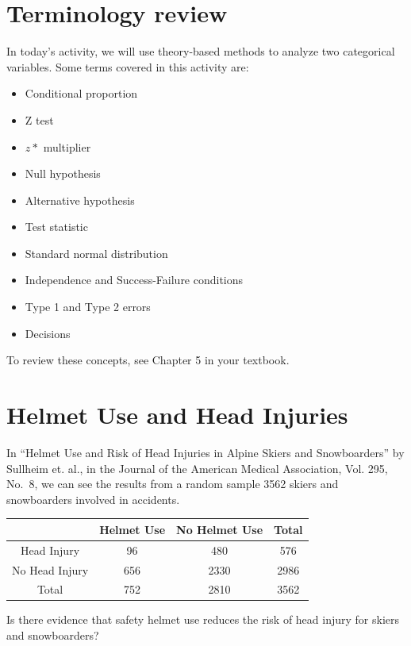 \documentclass[
]{report}
\begin{document}
\hypertarget{terminology-review}{%
\section{Terminology review}\label{terminology-review}}

In today's activity, we will use theory-based methods to analyze two categorical variables. Some terms covered in this activity are:

\begin{itemize}
\item
  Conditional proportion
\item
  Z test
\item
  \(z*\) multiplier
\item
  Null hypothesis
\item
  Alternative hypothesis
\item
  Test statistic
\item
  Standard normal distribution
\item
  Independence and Success-Failure conditions
\item
  Type 1 and Type 2 errors
\item
  Decisions
\end{itemize}

To review these concepts, see Chapter 5 in your textbook.

\newpage

\hypertarget{helmet-use-and-head-injuries}{%
\section{Helmet Use and Head Injuries}\label{helmet-use-and-head-injuries}}

In ``Helmet Use and Risk of Head Injuries in Alpine Skiers and Snowboarders'' by Sullheim et. al., in the Journal of the American Medical Association, Vol. 295, No.~8, we can see the results from a random sample 3562 skiers and snowboarders involved in accidents.

\begin{longtable}[]{@{}cccc@{}}
\toprule
& Helmet Use & No Helmet Use & Total\tabularnewline
\midrule
\endhead
Head Injury & 96 & 480 & 576\tabularnewline
No Head Injury & 656 & 2330 & 2986\tabularnewline
Total & 752 & 2810 & 3562\tabularnewline
\bottomrule
\end{longtable}

Is there evidence that safety helmet use reduces the risk of head injury for skiers and snowboarders?
\end{document}

